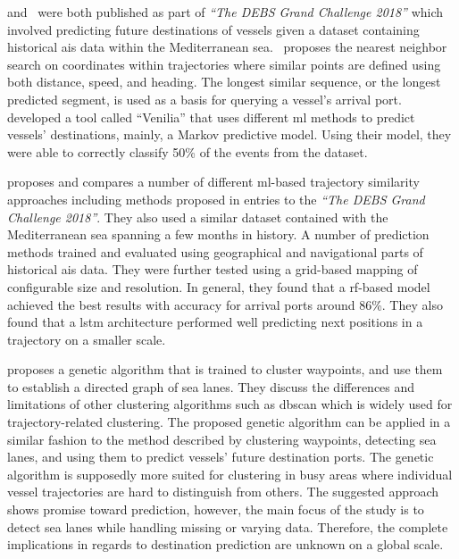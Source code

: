 \cite{Rosca2018GrandRoutes} and~\cite{Bachar2018GrandDestination} were both published as part of \textit{``The DEBS Grand Challenge 2018''} which involved predicting future destinations of vessels given a dataset containing historical \acrshort{ais} data within the Mediterranean sea.~\cite{Rosca2018GrandRoutes} proposes the nearest neighbor search on coordinates within trajectories where similar points are defined using both distance, speed, and heading. The longest similar sequence, or the longest predicted segment, is used as a basis for querying a vessel's arrival port.~\cite{Bachar2018GrandDestination} developed a tool called ``Venilia'' that uses different \acrshort{ml} methods to predict vessels' destinations, mainly, a Markov predictive model. Using their model, they were able to correctly classify 50\% of the events from the dataset.

\cite{Karatas2020TrajectoryData} proposes and compares a number of different \acrshort{ml}-based trajectory similarity approaches including methods proposed in entries to the \textit{``The DEBS Grand Challenge 2018''}. They also used a similar dataset contained with the Mediterranean sea spanning a few months in history. A number of prediction methods trained and evaluated using geographical and navigational parts of historical \acrshort{ais} data. They were further tested using a grid-based mapping of configurable size and resolution. In general, they found that a \acrshort{rf}-based model achieved the best results with accuracy for arrival ports around 86\%. They also found that a \acrfull{lstm} architecture performed well predicting next positions in a trajectory on a smaller scale.

\cite{Dobrkovic2018MaritimeData} proposes a genetic algorithm that is trained to cluster waypoints, and use them to establish a directed graph of sea lanes. They discuss the differences and limitations of other clustering algorithms such as \acrshort{dbscan} which is widely used for trajectory-related clustering. The proposed genetic algorithm can be applied in a similar fashion to the method described \cite{pallotta} by clustering waypoints, detecting sea lanes, and using them to predict vessels' future destination ports. The genetic algorithm is supposedly more suited for clustering in busy areas where individual vessel trajectories are hard to distinguish from others. The suggested approach shows promise toward prediction, however, the main focus of the study is to detect sea lanes while handling missing or varying data. Therefore, the complete implications in regards to destination prediction are unknown on a global scale.

